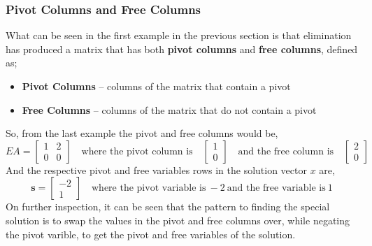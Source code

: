         \subsubsection{Pivot Columns and Free Columns}
            What can be seen in the first example in the previous section is that elimination has produced a matrix 
            that has both \textbf{pivot columns} and \textbf{free columns}, defined as;
            \begin{itemize}
                \item \textbf{Pivot Columns} – columns of the matrix that contain a pivot
                \item \textbf{Free Columns} – columns of the matrix that do not contain a pivot
            \end{itemize}
            So, from the last example the pivot and free columns would be,
            \begin{equation}
                EA = 
                \begin{bmatrix}
                    1 & 2 \\
                    0 & 0
                \end{bmatrix}
                \quad \textrm{where the pivot column is} \quad
                \begin{bmatrix}
                    1 \\ 0
                \end{bmatrix}
                \quad \textrm{and the free column is} \quad
                \begin{bmatrix}
                    2 \\ 0
                \end{bmatrix}
            \end{equation}
            And the respective pivot and free variables rows in the solution vector \(x\) are,
            \begin{equation}
                \boldsymbol{s} = 
                \begin{bmatrix}
                    -2 \\ 1
                \end{bmatrix}
                \quad \textrm{where the pivot variable is} \ -2 \ \textrm{and the free variable is} \ 1
            \end{equation}
            On further inspection, it can be seen that the pattern to finding the special solution is to swap the
            values in the pivot and free columns over, while negating the pivot varible, to get the pivot and free
            variables of the solution.

